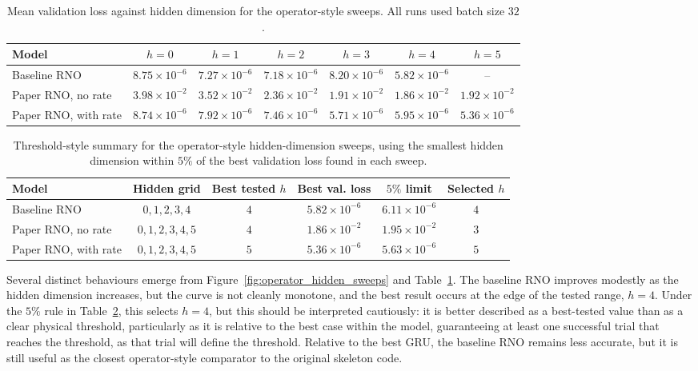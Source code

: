 \documentclass[11pt,a4paper, onecolumn]{article}
\begin{document}
\begin{table}[h]
\centering
\caption{Mean validation loss against hidden dimension for the operator-style sweeps. All runs used batch size $32$.}
\label{tab:operator_hidden_losses}
\begin{tabular}{lcccccc}
\toprule
Model & $h=0$ & $h=1$ & $h=2$ & $h=3$ & $h=4$ & $h=5$ \\
\midrule
Baseline RNO
& $8.75\times10^{-6}$
& $7.27\times10^{-6}$
& $7.18\times10^{-6}$
& $8.20\times10^{-6}$
& $5.82\times10^{-6}$
& -- \\
Paper RNO, no rate
& $3.98\times10^{-2}$
& $3.52\times10^{-2}$
& $2.36\times10^{-2}$
& $1.91\times10^{-2}$
& $1.86\times10^{-2}$
& $1.92\times10^{-2}$ \\
Paper RNO, with rate
& $8.74\times10^{-6}$
& $7.92\times10^{-6}$
& $7.46\times10^{-6}$
& $5.71\times10^{-6}$
& $5.95\times10^{-6}$
& $5.36\times10^{-6}$ \\
\bottomrule
\end{tabular}
\end{table}

\begin{table}[h]
\centering
\caption{Threshold-style summary for the operator-style hidden-dimension sweeps, using the smallest hidden dimension within $5\%$ of the best validation loss found in each sweep.}
\label{tab:operator_threshold_summary}
\begin{tabular}{lccccc}
\toprule
Model & Hidden grid & Best tested $h$ & Best val. loss & $5\%$ limit & Selected $h$ \\
\midrule
Baseline RNO
& $0,1,2,3,4$
& $4$
& $5.82\times10^{-6}$
& $6.11\times10^{-6}$
& $4$ \\
Paper RNO, no rate
& $0,1,2,3,4,5$
& $4$
& $1.86\times10^{-2}$
& $1.95\times10^{-2}$
& $3$ \\
Paper RNO, with rate
& $0,1,2,3,4,5$
& $5$
& $5.36\times10^{-6}$
& $5.63\times10^{-6}$
& $5$ \\
\bottomrule
\end{tabular}
\end{table}

\FloatBarrier

Several distinct behaviours emerge from Figure~\ref{fig:operator_hidden_sweeps} and Table~\ref{tab:operator_hidden_losses}. The baseline RNO improves modestly as the hidden dimension increases, but the curve is not cleanly monotone, and the best result occurs at the edge of the tested range, $h=4$. Under the $5\%$ rule in Table~\ref{tab:operator_threshold_summary}, this selects $h=4$, but this should be interpreted cautiously: it is better described as a best-tested value than as a clear physical threshold, particularly as it is relative to the best case within the model, guaranteeing at least one successful trial that reaches the threshold, as that trial will define the threshold. Relative to the best GRU, the baseline RNO remains less accurate, but it is still useful as the closest operator-style comparator to the original skeleton code.
\end{document}
